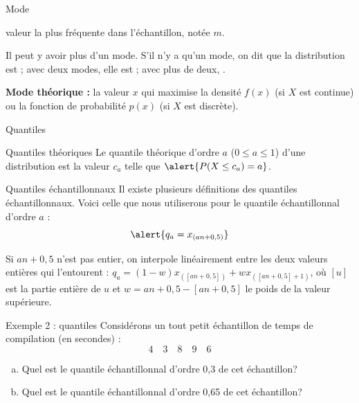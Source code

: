 \documentclass{BeamerTemplate}
\newcommand{\cibleReponse}{}
\newcommand{\lienreponse}[1]{\gdef\cibleReponse{#1}}
\begin{document}
\begin{frame}[t]{Mode}

 valeur la plus fréquente dans l'échantillon, notée $m$.

\vspace{0.3in}
Il peut y avoir plus d'un mode. S'il n'y a qu'un mode, on dit que la distribution est
; avec deux modes, elle est ; avec plus de deux, .

\vspace{0.3in}
\textbf{Mode théorique :} la valeur $x$ qui maximise la densité $f(x)$ (si $X$ est continue) ou la
fonction de probabilité $p(x)$ (si $X$ est discrète).

\end{frame}


\begin{frame}[t]{Quantiles}
\vspace{-0.4cm}
\begin{Boite}{Quantiles théoriques}
Le quantile théorique d'ordre $a$ ($0\leq a\leq 1$) d'une distribution est la valeur $c_a$ telle que
$\alert{P(X\le c_a)=a}$.
\end{Boite}
\begin{Boite}{Quantiles échantillonnaux}
Il existe plusieurs définitions des quantiles échantillonnaux. Voici celle que nous utiliserons pour le
quantile échantillonnal d'ordre $a$ :
$$\alert{q_a=x_{(an+0,5)}}$$
\end{Boite}
{\footnotesize
Si $an+0,5$ n'est pas entier, on interpole linéairement entre les deux valeurs entières qui l'entourent :
$q_a=(1-w)x_{([an+0,5])}+wx_{([an+0,5]+1)}$, où $[u]$ est la partie entière de $u$ et $w=an+0,5-[an+0,5]$
le poids de la valeur supérieure.
}
\end{frame}


\begin{frame}[t,label=exquantiles]{Exemple 2 : quantiles}
Considérons un tout petit échantillon de temps de compilation (en secondes) :
$$4\quad 3\quad 8\quad 9\quad 6$$

\begin{enumerate}[a)]
\item Quel est le quantile échantillonnal d'ordre 0,3 de cet échantillon?
\vspace{1.2cm}

\item  Quel est le quantile échantillonnal d'ordre 0,65 de cet échantillon?
\end{enumerate}
\lienreponse{rep-ex}
\end{frame}
\end{document}
